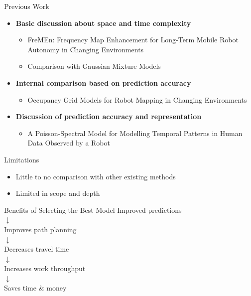 \documentclass{beamer}
\begin{document}
\begin{frame}[t]{Previous Work}

  \begin{itemize}
    \item \textbf{Basic discussion about space and time complexity}
      \begin{itemize}
        \item \scriptsize FreMEn: Frequency Map Enhancement for Long-Term Mobile Robot Autonomy in Changing Environments \cite{Krajnik2015} \normalsize
        \item Comparison with Gaussian Mixture Models
      \end{itemize}


    \item \textbf{Internal comparison based on prediction accuracy}
      \begin{itemize}
        \item \scriptsize Occupancy Grid Models for Robot Mapping in Changing Environments \cite{Meyer-Delius2012} \normalsize
      \end{itemize}

    \item \textbf{Discussion of prediction accuracy and representation}
      \begin{itemize}
        \item \scriptsize A Poisson-Spectral Model for Modelling Temporal Patterns in Human Data Observed by a Robot \cite{Jovan2016} \normalsize
      \end{itemize}
  \end{itemize}

  \begin{block}{Limitations}
    \begin{itemize}
      \item Little to no comparison with other existing methods
      \item Limited in scope and depth
    \end{itemize}
  \end{block}

\end{frame}



\begin{frame}{Benefits of Selecting the Best Model}
  \centering
    Improved predictions
    \\
    $\downarrow$
    \\
    Improves path planning
    \\
    $\downarrow$
    \\
    Decreases travel time
    \\
    $\downarrow$
    \\
    Increases work throughput
    \\
    $\downarrow$
    \\
    Saves time \& money
    \\
\end{frame}
\end{document}

